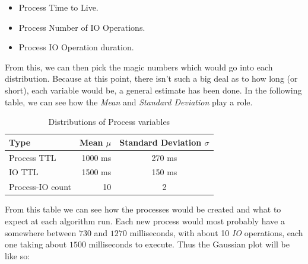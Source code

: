 \documentclass{article}
\newcommand{\code}[1]{\codeinline{\texttt{#1}}}
\begin{document}
\begin{itemize}
\item Process Time to Live.
\item Process Number of IO Operations.
\item Process IO Operation duration.
\end{itemize}

From this, we can then pick the magic numbers which would go into each distribution. Because at this point, there isn't such a big deal as to how long (or short), each variable would be, a general estimate has been done. In the following table, we can see how the \textit{Mean} and \textit{Standard Deviation} play a role.

\begin{table}[H]
  \begin{center}
    \label{tab:Distributions of Process variables}
    \begin{tabular}{l|r|c}
      \toprule
       \textbf{Type} & \textbf{Mean $\mu$} & \textbf{Standard Deviation $\sigma$} \\
      \midrule
      Process TTL & 1000 ms & 270 ms \\
      IO TTL & 1500 ms & 150 ms \\
      Process-IO count & 10 & 2 \\
      \bottomrule
    \end{tabular}
    \caption{Distributions of Process variables}
  \end{center}
\end{table}

From this table we can see how the processes would be created and what to expect at each algorithm run. Each new process would most probably have a \code{time\_to\_live} somewhere between $730$ and $1270$ milliseconds, with about 10 \textit{IO} operations, each one taking about $1500$ milliseconds to execute. Thus the Gaussian plot will be like so:

\end{document}
